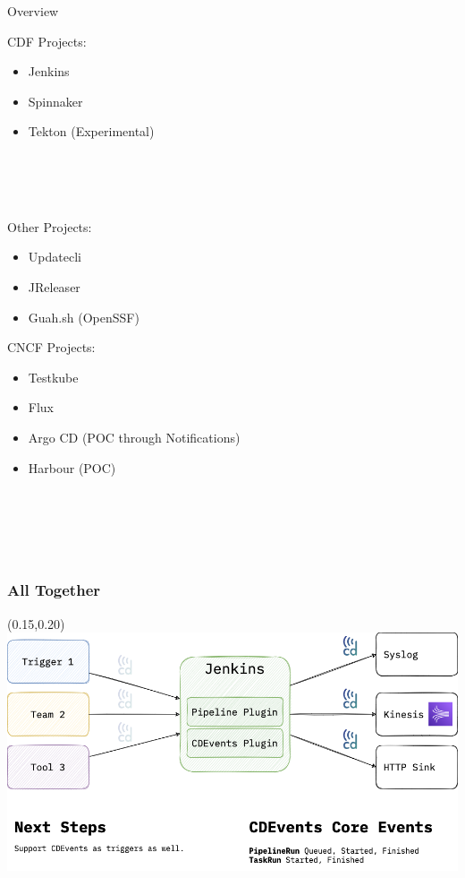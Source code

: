 \documentclass[aspectratio=169,11pt,hyperref={colorlinks=true}]{beamer}
\begin{document}
\begin{3squares}{Overview}{%
    CDF Projects:
    \begin{itemize}
      \item Jenkins
      \item Spinnaker
      \item Tekton (Experimental)
    \end{itemize}
    ~ \\
    ~ \\
    ~ \\
  }{%
  Other Projects:
  \begin{itemize}
    \item Updatecli
    \item JReleaser
    \item Guah.sh (OpenSSF)
  \end{itemize}
  }{%
  CNCF Projects:
  \begin{itemize}
    \item Testkube
    \item Flux
    \item Argo CD (POC through Notifications)
    \item Harbour (POC)
  \end{itemize}
  ~ \\
  ~ \\
  ~ \\
  ~ \\
  }
\end{3squares}

\begin{grayframe}
  \frametitle{All Together}
  \begin{textblock*}{0.70\paperwidth}(0.15\paperwidth,0.20\paperheight)
    \includegraphics[width=0.70\paperwidth]{img/cdevents-Jenkins.png}
  \end{textblock*}
\end{grayframe}
\end{document}
